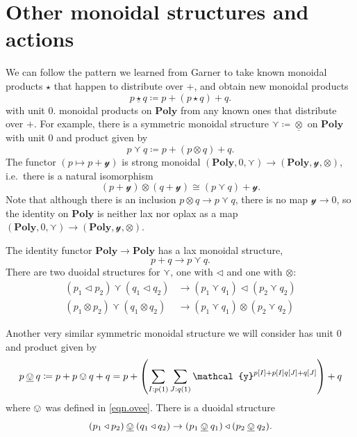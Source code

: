 \documentclass[11pt, one side, article]{memoir}
\theoremstyle{definition}
\theoremstyle{plain}
\newcommand{\Cat}[1]{\mathbf{#1}}%
\newcommand{\ul}[1]{\underline{#1}}
\newcommand{\yon}{{\mathcal{y}}}
\newcommand{\poly}{\Cat{Poly}}
\newcommand{\0}{\textsf{0}}
\newcommand{\1}{\tn{\textsf{1}}}
\newcommand{\tri}{\mathbin{\triangleleft}}
\newcommand{\OR}{\curlyvee}
\newcommand{\garner}[1]{\mathbin{\ul{#1}}}
\begin{document}
\chapter{Other monoidal structures and actions}

We can follow the pattern we learned from Garner to take known monoidal products $\star$ that happen to distribute over $+$, and obtain new monoidal products
\begin{equation}
p\garner{\star} q\coloneqq p+(p\star q) + q.
\end{equation}
with unit 0.  monoidal products on $\poly$ from any known ones that distribute over $+$. For example, there is a symmetric monoidal structure $\OR\coloneqq\garner\otimes$ on $\poly$ with unit $0$ and product given by
\begin{equation}\label{eqn.vee}
  p\OR q\coloneqq p+(p\otimes q)+q.
\end{equation}
The functor $(p\mapsto p+\yon)$ is strong monoidal $(\poly,0,\OR)\to(\poly,\yon,\otimes)$, i.e.\ there is a natural isomorphism
\begin{equation}
	(p+\yon)\otimes(q+\yon)\cong (p\OR q)+\yon.
\end{equation}
Note that although there is an inclusion $p\otimes q\to p\OR q$, there is no map $\yon\to0$, so the identity on $\poly$ is neither lax nor oplax as a map $(\poly,0,\OR)\to(\poly,\yon,\otimes)$.

The identity functor $\poly\to\poly$ has a lax monoidal structure,
\begin{equation}
	p+q\to p\OR q.
\end{equation}
There are two duoidal structures for $\OR$, one with $\tri$ and one with $\otimes$:
\begin{align*}
	(p_1\tri p_2)\OR(q_1\tri q_2)&\to(p_1\OR q_1)\tri(p_2\OR q_2)\\
	(p_1\otimes p_2)\OR(q_1\otimes q_2)&\to(p_1\OR q_1)\otimes(p_2\OR q_2)
\end{align*}

Another very similar symmetric monoidal structure we will consider has unit $0$ and product given by
\begin{equation}\label{eqn.garner_ovee}
	p\garner{\ovee} q\coloneqq p+p\ovee q+q=p+\left(\sum_{I:p(1)}\sum_{J:q(1)}\yon^{p[I]+p[I]q[J]+q[J]}\right)+q
\end{equation}
where $\ovee$ was defined in \eqref{eqn.ovee}. There is a duoidal structure
\begin{equation}\label{eqn.ovee_garner}
	(p_1\tri p_2)\garner{\ovee} (q_1\tri q_2)\to(p_1\garner{\ovee} q_1)\tri(p_2\garner{\ovee} q_2).
\end{equation}
\end{document}
